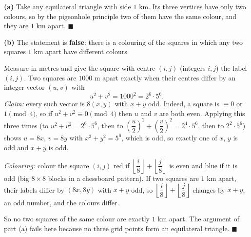 \textbf{(a)} Take any equilateral triangle with side $1$ km. Its three vertices have only two colours, so by the pigeonhole principle two of them have the same colour, and they are $1$ km apart. $\blacksquare$

\textbf{(b)} The statement is \textbf{false}: there is a colouring of the squares in which any two squares $1$ km apart have different colours.

Measure in metres and give the square with centre $(i,j)$ (integers $i,j$) the label $(i,j)$. Two squares are $1000$ m apart exactly when their centres differ by an integer vector $(u,v)$ with
\[
u^2+v^2=1000^2=2^6\cdot5^6 .
\]
\emph{Claim:} every such vector is $8(x,y)$ with $x+y$ odd. Indeed, a square is $\equiv0$ or $1\pmod4$, so if $u^2+v^2\equiv0\pmod4$ then $u$ and $v$ are both even. Applying this three times (to $u^2+v^2=2^6\cdot5^6$, then to $\left(\dfrac {u}{2}\right)^2+\left(\dfrac {v}{2}\right)^2=2^4\cdot5^6$, then to $2^2\cdot5^6$) shows $u=8x$, $v=8y$ with $x^2+y^2=5^6$, which is odd, so exactly one of $x$, $y$ is odd and $x+y$ is odd.

\emph{Colouring:} colour the square $(i,j)$ red if $\left\lfloor\dfrac {i}{8}\right\rfloor+\left\lfloor\dfrac {j}{8}\right\rfloor$ is even and blue if it is odd (big $8\times8$ blocks in a chessboard pattern). If two squares are $1$ km apart, their labels differ by $(8x,8y)$ with $x+y$ odd, so $\left\lfloor\dfrac {i}{8}\right\rfloor+\left\lfloor\dfrac {j}{8}\right\rfloor$ changes by $x+y$, an odd number, and the colours differ.

So no two squares of the same colour are exactly $1$ km apart. The argument of part (a) fails here because no three grid points form an equilateral triangle. $\blacksquare$
